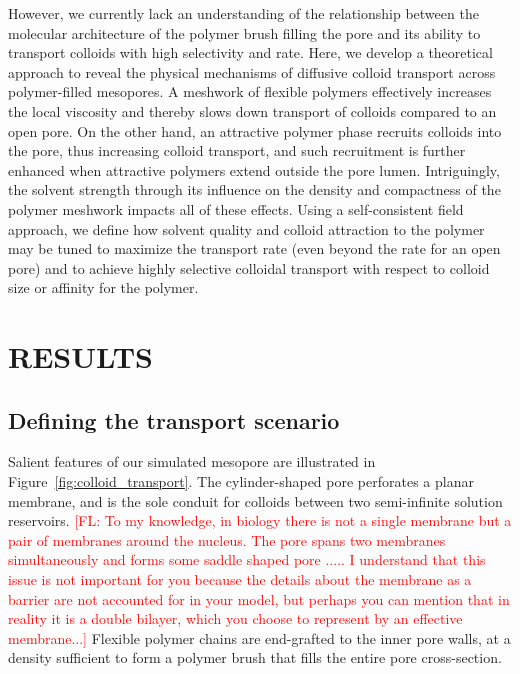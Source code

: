 \documentclass[12pt, a4paper]{article}
\newcommand\todo[1]{\textcolor{red}{#1}}
\begin{document}
However, we currently lack an understanding of the relationship between the molecular architecture of the polymer brush filling the pore and its ability to transport colloids with high selectivity and rate. Here, we develop a theoretical approach to reveal the physical mechanisms of diffusive colloid transport across polymer-filled mesopores.
A meshwork of flexible polymers effectively increases the local viscosity and thereby slows down transport of colloids compared to an open pore. 
On the other hand, an attractive polymer phase recruits colloids into the pore, thus increasing colloid transport, and such recruitment is further enhanced when attractive polymers extend outside the pore lumen. 
Intriguingly, the solvent strength through its influence on the density and compactness of the polymer meshwork impacts all of these effects. 
Using a self-consistent field approach, we define how solvent quality and colloid attraction to the polymer may be tuned to maximize the transport rate (even beyond the rate for an open pore) and to achieve highly selective colloidal transport with respect to colloid size or affinity for the polymer.


\section{RESULTS}


\subsection{Defining the transport scenario}

Salient features of our simulated mesopore are illustrated in Figure~\ref{fig:colloid_transport}.
The cylinder-shaped pore perforates a planar membrane, and is the sole conduit for colloids between two semi-infinite solution reservoirs.
\todo{[FL: To my knowledge, in biology there is not a single membrane but a pair of membranes around the nucleus. The pore spans two membranes simultaneously and forms some saddle shaped pore ..... I understand that this issue is not important for you because the details about the membrane as a barrier are not accounted for in your model, but perhaps you can mention that in reality it is a double bilayer, which you choose to represent by an effective membrane...]}
Flexible polymer chains are end-grafted to the inner pore walls, at a density sufficient to form a polymer brush that fills the entire pore cross-section.
\end{document}
